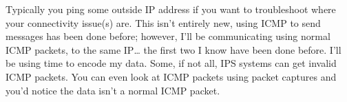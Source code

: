
Typically you ping some outside IP address if you want to troubleshoot where your connectivity issue(s) are.
\vspace{2ex} \newline
This isn't entirely new, using ICMP to send messages has been done before; however, I'll be communicating using normal ICMP packets, to the same IP… the first two I know have been done before. 
I'll be using time to encode my data. 
Some, if not all, IPS systems can get invalid ICMP packets. 
You can even look at ICMP packets using packet captures and you'd notice the data isn't a normal ICMP packet.

